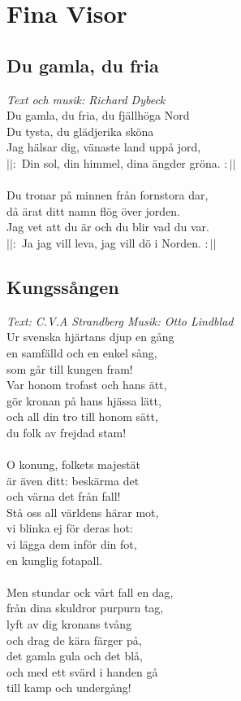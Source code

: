 \chapter{Fina Visor}
\section{Du gamla, du fria}
\textit{Text och musik: Richard Dybeck}
\vspace{2mm}\\
Du gamla, du fria, du fjällhöga Nord\\
Du tysta, du glädjerika sköna\\
Jag hälsar dig, vänaste land uppå jord,\\
$||:$ Din sol, din himmel, dina ängder gröna. $:||$\\
\\
Du tronar på minnen från fornstora dar,\\
då ärat ditt namn flög över jorden.\\
Jag vet att du är och du blir vad du var.\\
$||:$ Ja jag vill leva, jag vill dö i Norden. $:||$

\section{Kungssången}
\textit{Text: C.V.A Strandberg \hspace{5mm} Musik: Otto Lindblad}
\vspace{2mm}\\
Ur svenska hjärtans djup en gång \\
en samfälld och en enkel sång,\\
som går till kungen fram!\\
Var honom trofast och hans ätt,\\
gör kronan på hans hjässa lätt,\\
och all din tro till honom sätt,\\
du folk av frejdad stam!\\
\\
O konung, folkets majestät\\
är även ditt: beskärma det\\
och värna det från fall!\\
Stå oss all världens härar mot,\\
vi blinka ej för deras hot:\\
vi lägga dem inför din fot,\\
en kunglig fotapall.\\
\\
Men stundar ock vårt fall en dag,\\
från dina skuldror purpurn tag,\\
lyft av dig kronans tvång\\
och drag de kära färger på,\\
det gamla gula och det blå,\\
och med ett svärd i handen gå\\
till kamp och undergång!\\

